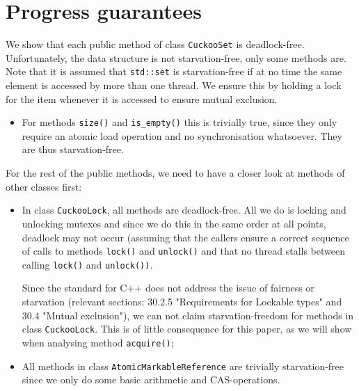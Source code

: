 \documentclass[a4paper,10pt]{article}
\begin{document}
\section{Progress guarantees}
\label{sec:progressGuarantees}
We show that each public method of class \lstinline|CuckooSet| is
deadlock-free. Unfortunately, the data structure is not starvation-free, only
some methods are. Note that it is assumed that \lstinline|std::set| is
starvation-free if at no time the same element is accessed by more than one
thread. We ensure this by holding a lock for the item whenever it is accessed
to ensure mutual exclusion.
\begin{itemize}
\item For methods \lstinline|size()| and \lstinline|is_empty()| this is
    trivially true, since they only require an atomic load operation and no
    synchronisation 
whatsoever. They are thus starvation-free.
\end{itemize}
For the rest of the public methods, we need to have a closer look at methods of
other classes first:
\begin{itemize}
\item In class \lstinline|CuckooLock|, all methods are deadlock-free. All we do
    is locking and unlocking mutexes and since we do this in the same order at
    all points, deadlock may not occur (assuming that the callers ensure a
    correct sequence of calls to methods \lstinline|lock()| and
    \lstinline|unlock()| and that no thread stalls between calling
    \lstinline|lock()| and \lstinline|unlock())|. 

Since the standard for C++ \cite{cppstandard} does not address the issue of
fairness or starvation (relevant sections: 30.2.5 "Requirements for Lockable
types" and 30.4 "Mutual exclusion"), we can not claim starvation-freedom for
methods in class \lstinline|CuckooLock|. This is of little consequence for this
paper, as we will show when analysing method \lstinline|acquire()|;
\item All methods in class \lstinline|AtomicMarkableReference| are trivially
    starvation-free since we only do some basic arithmetic and CAS-operations.
\end{itemize}
\end{document}
